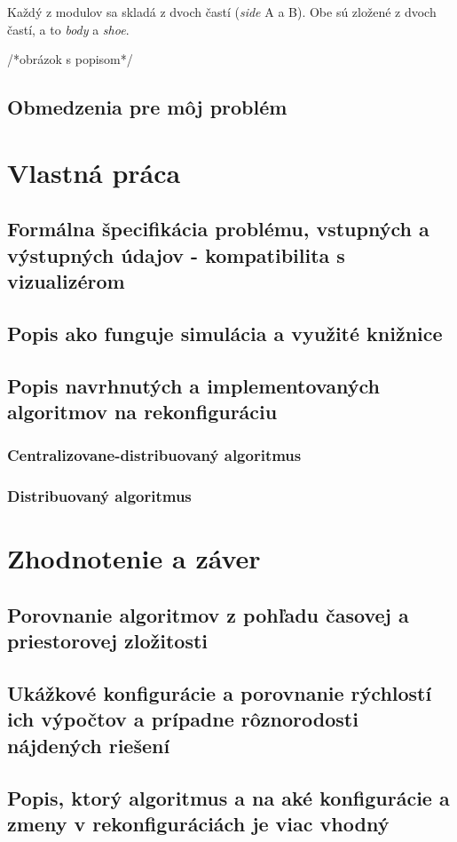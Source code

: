 \documentclass[
  digital, %
  twoside, %
  table,   %
  nolof,     %
  nolot,     %
]{fithesis3}
\begin{document}
Každý z modulov sa skladá z dvoch častí (\textit{side} A a B). Obe sú zložené z dvoch častí, a to \textit{body} a \textit{shoe}. 

/*obrázok s popisom*/



\section{Obmedzenia pre môj problém}
\label{sec:restrictions}

\chapter{Vlastná práca}
\section{Formálna špecifikácia problému, vstupných a výstupných údajov - kompatibilita s vizualizérom}
\section{Popis ako funguje simulácia a využité knižnice}
\section{Popis navrhnutých a implementovaných algoritmov na rekonfiguráciu}
\subsection{Centralizovane-distribuovaný algoritmus}
\subsection{Distribuovaný algoritmus}

\chapter{Zhodnotenie a záver}
\section{Porovnanie algoritmov z pohľadu časovej a priestorovej zložitosti}
\section{Ukážkové konfigurácie a porovnanie rýchlostí ich výpočtov a prípadne rôznorodosti nájdených riešení}
\section{Popis, ktorý algoritmus a na aké konfigurácie a zmeny v rekonfiguráciách je viac vhodný}

  \printbibliography[heading=bibintoc] %
\end{document}
